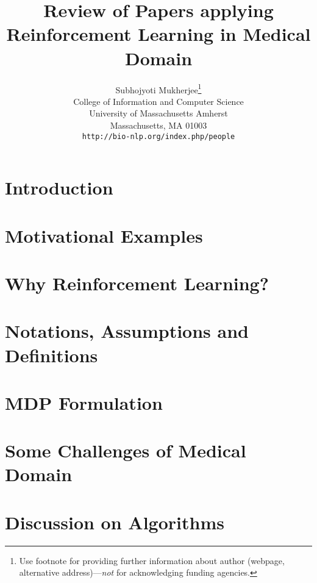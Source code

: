 \documentclass{article}
\title{Review of Papers applying Reinforcement Learning in Medical Domain}
\author{
  Subhojyoti Mukherjee\thanks{Use footnote for providing further
    information about author (webpage, alternative
    address)---\emph{not} for acknowledging funding agencies.} \\
  College of Information and Computer Science\\
  University of Massachusetts Amherst\\
  Massachusetts, MA 01003 \\
  \texttt{http://bio-nlp.org/index.php/people} \\
}
\begin{document}

\maketitle

\begin{abstract}

\end{abstract}




\section{Introduction}
\label{review:intro}


\section{Motivational Examples}
\label{review:motivation}


\section{Why Reinforcement Learning?}
\label{review:whyRL}


%


\section{Notations, Assumptions and Definitions}
\label{review:notations}



\section{MDP Formulation}
\label{review:mdp}


\section{Some Challenges of Medical Domain}
\label{review:complexity}


\section{Discussion on Algorithms}
\label{review:algorithm}

\end{document}
